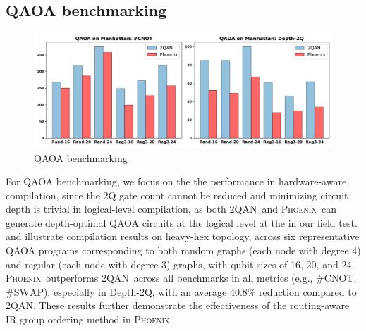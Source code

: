 \documentclass[conference]{IEEEtran}
\newcommand{\phoenix}{\textsc{Phoenix}}
\newcommand{\twoqan}{\textsc{2QAN}}
\newcommand{\SWAP}{\mathrm{SWAP}}
\newcommand{\CNOT}{\mathrm{CNOT}}
\begin{document}







\subsection{QAOA benchmarking}

    \begin{figure}[tbp]
        \centering
        \includegraphics[width=\columnwidth]{figures/qaoa.pdf}
        \caption{QAOA benchmarking}
        \label{fig:qaoa}
    \end{figure}



    \begin{table}[btp]
        \centering
        \caption{QAOA benchmarking versus 2QAN.}
        \setlength{\tabcolsep}{3.8pt}
        \scalebox{0.78}{
            
        }
        \label{tab:qaoa}
    \end{table}

    For QAOA benchmarking, we focus on the the performance in hardware-aware compilation, since the 2Q gate count cannot be reduced and minimizing circuit depth is trivial in logical-level compilation, as both \twoqan\ and \phoenix\ can generate depth-optimal QAOA circuits at the logical level at the in our field test.  and  illustrate compilation results on heavy-hex topology, across six representative QAOA programs corresponding to both random graphs (each node with degree 4) and regular (each node with degree 3) graphs, with qubit sizes of 16, 20, and 24. \phoenix\ outperforms \twoqan\ across all benchmarks in all metrics (e.g., \#$ \CNOT $, \#$ \SWAP $), especially in Depth-2Q, with an average 40.8\% reduction compared to \twoqan. These results further demonstrate the effectiveness of the routing-aware IR group ordering method in \phoenix.
\end{document}
